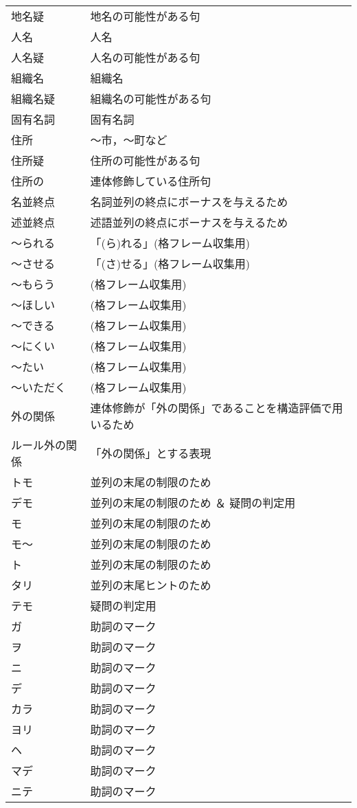 \documentclass[a4j]{jarticle}
\begin{document}
\begin{supertabular}{p{4.2cm}p{9.6cm}}
地名疑 & 地名の可能性がある句\\
人名 & 人名 \\
人名疑 & 人名の可能性がある句 \\
組織名 & 組織名 \\
組織名疑 & 組織名の可能性がある句 \\
固有名詞 & 固有名詞 \\
住所 & 〜市，〜町など\\
住所疑 & 住所の可能性がある句\\
住所の & 連体修飾している住所句\\
名並終点 & 名詞並列の終点にボーナスを与えるため\\
述並終点 & 述語並列の終点にボーナスを与えるため \\
〜られる & 「(ら)れる」(格フレーム収集用)\\
〜させる & 「(さ)せる」(格フレーム収集用)\\
〜もらう & (格フレーム収集用)\\
〜ほしい & (格フレーム収集用)\\
〜できる & (格フレーム収集用)\\
〜にくい & (格フレーム収集用)\\
〜たい & (格フレーム収集用)\\
〜いただく & (格フレーム収集用)\\
外の関係 & 連体修飾が「外の関係」であることを構造評価で用いるため\\
ルール外の関係 & 「外の関係」とする表現\\
トモ & 並列の末尾の制限のため\\
デモ & 並列の末尾の制限のため ＆ 疑問の判定用\\
モ &   並列の末尾の制限のため\\
モ〜 & 並列の末尾の制限のため\\
ト &   並列の末尾の制限のため\\
タリ & 並列の末尾ヒントのため\\
テモ & 疑問の判定用\\
ガ &   助詞のマーク\\
ヲ &   助詞のマーク\\
ニ &   助詞のマーク\\
デ &   助詞のマーク\\
カラ & 助詞のマーク\\
ヨリ & 助詞のマーク\\
ヘ &   助詞のマーク\\
マデ & 助詞のマーク\\
ニテ & 助詞のマーク\\

\end{supertabular}
\end{document}
